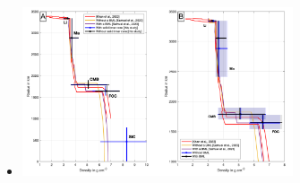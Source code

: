\begin{itemize}
\item {}


\begin{center}
\includegraphics[width=8cm]{images/mars/density/gufm24}
\end{center}

\end{itemize}
